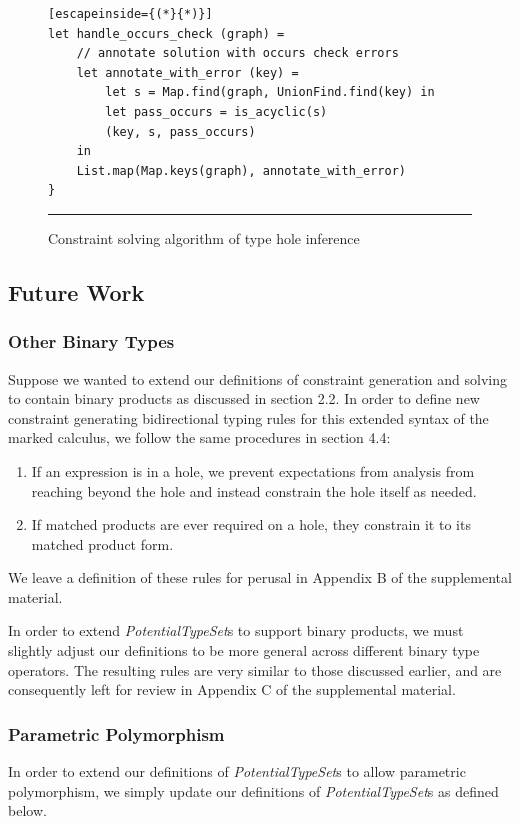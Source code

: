 \begin{figure}[h!]
\begin{lstlisting}[escapeinside={(*}{*)}]
let handle_occurs_check (graph) =
    // annotate solution with occurs check errors
    let annotate_with_error (key) =
        let s = Map.find(graph, UnionFind.find(key) in
        let pass_occurs = is_acyclic(s)
        (key, s, pass_occurs)
    in
    List.map(Map.keys(graph), annotate_with_error)
}
\end{lstlisting}
\vspace{-4px}
 \hrule
\caption{Constraint solving algorithm of type hole inference}
\label{fig:occurs_check}
\end{figure}

\subsection{Future Work}
\subsubsection{Other Binary Types}
Suppose we wanted to extend our definitions of constraint generation and solving to contain binary products as discussed in section 2.2. In order to define new constraint generating bidirectional typing rules for this extended syntax of the marked calculus, we follow the same procedures in section 4.4: 
\begin{enumerate}
    \item If an expression is in a hole, we prevent expectations from analysis from reaching beyond the hole and instead constrain the hole itself as needed.
    \item If matched products are ever required on a hole, they constrain it to its matched product form.
\end{enumerate}
We leave a definition of these rules for perusal in Appendix B of the supplemental material.

In order to extend \emph{PotentialTypeSet}s to support binary products, we must slightly adjust our definitions to be more general across different binary type operators. The resulting rules are very similar to those discussed earlier, and are consequently left for review in Appendix C of the supplemental material.

\subsubsection{Parametric Polymorphism}
In order to extend our definitions of \emph{PotentialTypeSet}s to allow parametric polymorphism, we simply update our definitions of \emph{PotentialTypeSet}s as defined below.

